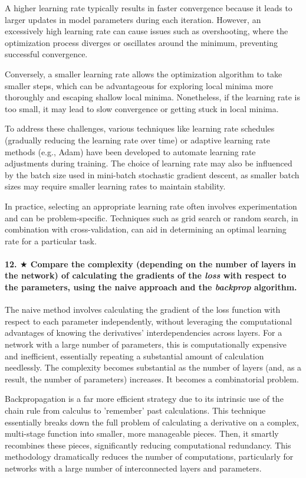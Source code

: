 \documentclass{article}
\theoremstyle{plain}%
\theoremstyle{definition}
\theoremstyle{remark}
\begin{document}
A higher learning rate typically results in faster convergence because it leads to larger updates in model parameters during each iteration. However, an excessively high learning rate can cause issues such as overshooting, where the optimization process diverges or oscillates around the minimum, preventing successful convergence.

Conversely, a smaller learning rate allows the optimization algorithm to take smaller steps, which can be advantageous for exploring local minima more thoroughly and escaping shallow local minima. Nonetheless, if the learning rate is too small, it may lead to slow convergence or getting stuck in local minima.

To address these challenges, various techniques like learning rate schedules (gradually reducing the learning rate over time) or adaptive learning rate methods (e.g., Adam) have been developed to automate learning rate adjustments during training. The choice of learning rate may also be influenced by the batch size used in mini-batch stochastic gradient descent, as smaller batch sizes may require smaller learning rates to maintain stability.

In practice, selecting an appropriate learning rate often involves experimentation and can be problem-specific. Techniques such as grid search or random search, in combination with cross-validation, can aid in determining an optimal learning rate for a particular task.

\paragraph{12. $\bigstar$ Compare the complexity (depending on the number of layers in the network) of calculating the gradients of the \textit{loss} with respect to the parameters, using the naive approach and the \textit{backprop} algorithm.}
The naive method involves calculating the gradient of the loss function with respect to each parameter independently, without leveraging the computational advantages of knowing the derivatives' interdependencies across layers. For a network with a large number of parameters, this is computationally expensive and inefficient, essentially repeating a substantial amount of calculation needlessly. The complexity becomes substantial as the number of layers (and, as a result, the number of parameters) increases. It becomes a combinatorial problem.

Backpropagation is a far more efficient strategy due to its intrinsic use of the chain rule from calculus to 'remember' past calculations. This technique essentially breaks down the full problem of calculating a derivative on a complex, multi-stage function into smaller, more manageable pieces. Then, it smartly recombines these pieces, significantly reducing computational redundancy. This methodology dramatically reduces the number of computations, particularly for networks with a large number of interconnected layers and parameters.
\end{document}
